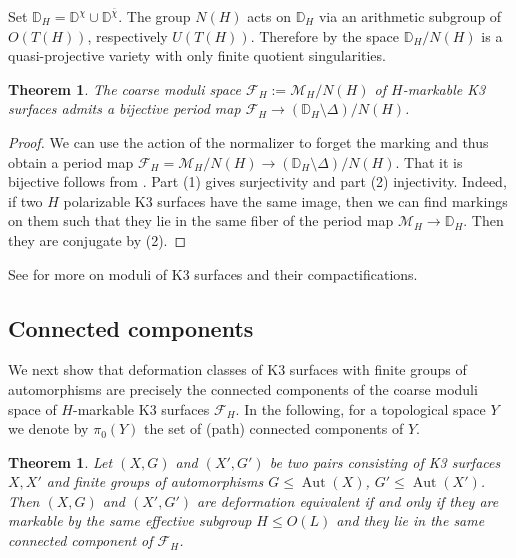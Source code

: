 \documentclass[a4paper]{amsart}
\theoremstyle{definition}
\theoremstyle{plain}
\newtheorem{theorem}[definition]{Theorem}
\DeclareMathOperator{\Aut}{Aut}
\newcommand{\DD}{\mathbb{D}}
\newcommand{\M}{\mathcal{M}}
\newcommand{\F}{\mathcal{F}}
\begin{document}
Set $\DD_H = \DD^\chi \cup \DD^{\bar \chi}$.
The group $N(H)$ acts on $\DD_H$ via an arithmetic subgroup of $O(T(H))$, respectively $U(T(H))$.
Therefore by \cite{baily-borel1966} the space $\DD_H/N(H)$ is a quasi-projective variety with only finite quotient singularities.

\begin{theorem}
 The coarse moduli space $\F_H:=\M_H/N(H)$ of $H$-markable K3 surfaces admits a bijective period map
 $\F_H \to (\DD_H \setminus \Delta)/N(H)$.
\end{theorem}
\begin{proof}
We can use the action of the normalizer to forget the marking and thus obtain a period map $\F_H =\M_H/N(H) \to (\DD_H\setminus \Delta)/N(H)$.
That it is bijective follows from . Part (1) gives surjectivity and part (2) injectivity. Indeed, if two $H$ polarizable K3 surfaces have the same image, then we can find markings on them such that they lie in the same fiber of the period map $\M_H \to \DD_H$. Then they are conjugate by  (2).
\end{proof}
See \cite{alexeev-engel,alexeev-engel-han} for more on moduli of K3 surfaces and their compactifications.

\subsection{Connected components}

We next show that deformation classes of K3 surfaces with
finite groups of automorphisms are precisely the connected components of the coarse moduli space
of $H$-markable K3 surfaces $\F_H$. In the following, for a topological space $Y$ we denote by $\pi_0(Y)$ the set of (path) connected components of $Y$.

\begin{theorem}\label{deformation class vs F_H}
  Let $(X,G)$ and $(X',G')$ be two pairs consisting of K3 surfaces $X, X'$ and finite groups of automorphisms $G \leq \Aut(X)$, $G' \leq \Aut(X')$. Then $(X,G)$ and $(X',G')$ are deformation equivalent if and only if they are markable by the same effective subgroup $H\leq O(L)$ and they lie in the same connected component of $\F_H$.
\end{theorem}
\end{document}
